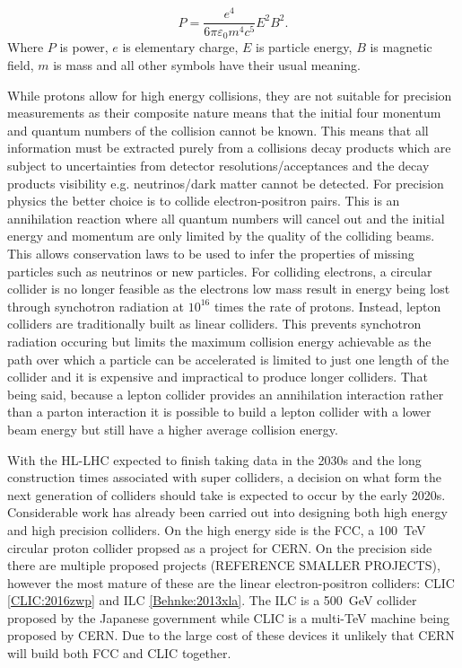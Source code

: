 \begin{equation}
\label{Eq:synchotron radiation}
P = \frac{e^4}{6\pi\varepsilon_0m^4c^5}E^2B^2.
\end{equation}
Where $P$ is power, $e$ is elementary charge, $E$ is particle energy, $B$ is magnetic field, $m$ is mass and all other symbols have their usual meaning.

While protons allow for high energy collisions, they are not suitable for precision measurements as their composite nature means that the initial four monentum and quantum numbers of the collision cannot be known. This means that all information must be extracted purely from a collisions decay products which are subject to uncertainties from detector resolutions/acceptances and the decay products visibility e.g. neutrinos/dark matter cannot be detected. For precision physics the better choice is to collide electron-positron pairs. This is an annihilation reaction where all quantum numbers will cancel out and the initial energy and momentum are only limited by the quality of the colliding beams. This allows conservation laws to be used to infer the properties of missing particles such as neutrinos or new particles. For colliding electrons, a circular collider is no longer feasible as the electrons low mass result in energy being lost through synchotron radiation at ${10^{16}}$ times the rate of protons. Instead, lepton colliders are traditionally built as linear colliders. This prevents synchotron radiation occuring but limits the maximum collision energy achievable as the path over which a particle can be accelerated is limited to just one length of the collider and it is expensive and impractical to produce longer colliders. That being said, because a lepton collider provides an annihilation interaction rather than a parton interaction it is possible to build a lepton collider with a lower beam energy but still have a higher average collision energy.

With the \ac{HL-LHC} expected to finish taking data in the 2030s and the long construction times associated with super colliders, a decision on what form the next generation of colliders should take is expected to occur by the early 2020s. Considerable work has already been carried out into designing both high energy and high precision colliders. On the high energy side is the \ac{FCC}, a 100~TeV circular proton collider propsed as a project for CERN. On the precision side there are multiple proposed projects (REFERENCE SMALLER PROJECTS), however the most mature of these are the linear electron-positron colliders: \ac{CLIC} \ref{CLIC:2016zwp} and \ac{ILC} \ref{Behnke:2013xla}. The \ac{ILC} is a 500~GeV collider proposed by the Japanese government while \ac{CLIC} is a multi-TeV machine being proposed by CERN. Due to the large cost of these devices it unlikely that CERN will build both \ac{FCC} and \ac{CLIC} together.

